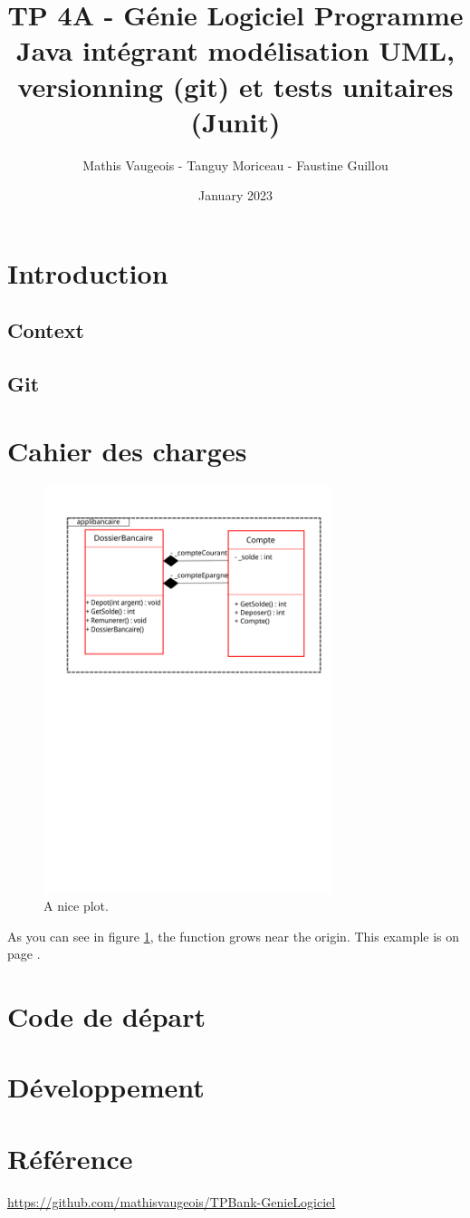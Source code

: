 \documentclass{article}
\title{TP 4A - Génie Logiciel
Programme Java intégrant modélisation UML, versionning (git)
et tests unitaires (Junit)
}
\author{Mathis Vaugeois - Tanguy Moriceau -  Faustine Guillou}
\date{January 2023}
\begin{document}
\maketitle
\tableofcontents

\newpage
\section{Introduction}

\subsection{Context}

\subsection{Git}
\newpage
\section{Cahier des charges}

\begin{figure}
    \centering
    \includegraphics[width=0.75\textwidth]{diagrammeClasse}
    \caption{A nice plot.}
    \label{fig:mesh1}
\end{figure}

As you can see in figure \ref{fig:mesh1}, the function grows near the origin. This example is on page \pageref{fig:mesh1}.
\newpage
\section{Code de départ}
\newpage
\section{Développement}
\newpage
\section*{Référence}
\url{https://github.com/mathisvaugeois/TPBank-GenieLogiciel}
\end{document}

